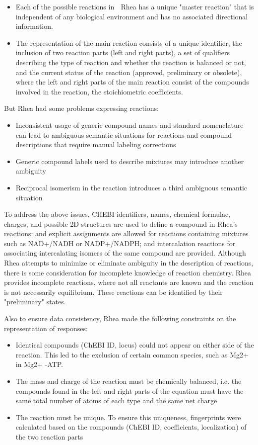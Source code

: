 \documentclass[%
 aip,
 jmp,%
 amsmath,amssymb,
 reprint,%
]{revtex4-2}
\begin{document}
\begin{itemize}
    \item Each of the possible reactions in  Rhea has a unique "master reaction" that is independent of any biological environment and has no associated directional information.
    \item The representation of the main reaction consists of a unique identifier, the inclusion of two reaction parts (left and right parts), a set of qualifiers describing the type of reaction and whether the reaction is balanced or not, and the current status of the reaction (approved, preliminary or obsolete), where the left and right parts of the main reaction consist of the compounds involved in the reaction, the stoichiometric coefficients.
\end{itemize}

But Rhea had some problems expressing reactions:

\begin{itemize}
    \item Inconsistent usage of generic compound names and standard nomenclature can lead to ambiguous semantic situations for reactions and compound descriptions that require manual labeling corrections
    \item Generic compound labels used to describe mixtures may introduce another ambiguity
    \item Reciprocal isomerism in the reaction introduces a third ambiguous semantic situation
\end{itemize}

To address the above issues, CHEBI identifiers, names, chemical formulae, charges, and possible 2D structures are used to define a compound in Rhea's reactions; and explicit assignments are allowed for reactions containing mixtures such as NAD+/NADH or NADP+/NADPH; and intercalation reactions for associating intercalating isomers of the same compound are provided. Although Rhea attempts to minimize or eliminate ambiguity in the description of reactions, there is some consideration for incomplete knowledge of reaction chemistry. Rhea provides incomplete reactions, where not all reactants are known and the reaction is not necessarily equilibrium. These reactions can be identified by their "preliminary" states.

Also to ensure data consistency, Rhea made the following constraints on the representation of responses:

\begin{itemize}
    \item Identical compounds (ChEBI ID, locus) could not appear on either side of the reaction. This led to the exclusion of certain common species, such as Mg2+ in Mg2+ -ATP.
    \item The mass and charge of the reaction must be chemically balanced, i.e. the compounds found in the left and right parts of the equation must have the same total number of atoms of each type and the same net charge
    \item The reaction must be unique. To ensure this uniqueness, fingerprints were calculated based on the compounds (ChEBI ID, coefficients, localization) of the two reaction parts
\end{itemize}
\end{document}
